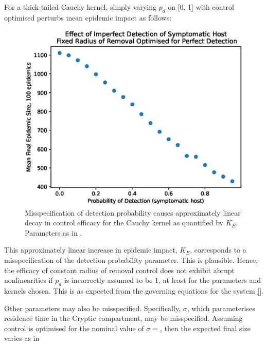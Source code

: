 \documentclass[prstpaper]{revtex4-2}
\begin{document}
For a thick-tailed Cauchy kernel, simply varying $p_d$ on [0, 1] with control optimised perturbs mean epidemic impact as follows: 

\begin{figure} [hbt!]
\includegraphics[scale=.4]{pd.eps}
\caption{\label{fig} Misspecification of detection probability causes approximately linear decay in control efficacy for the Cauchy kernel as quantified by $K_E$. Parameters as in \cite{HyattTwynham2017}. }
\end{figure}

This approximately linear increase in epidemic impact, $K_{E}$, corresponds to a misspecification of the detection probability parameter. This is plausible. Hence, the efficacy of constant radius of removal control does not exhibit abrupt nonlinearities if $p_{d}$ is incorrectly assumed to be 1, at least for the parameters and kernels chosen. This is as expected from the governing equations for the system \ref{}.  

%

Other parameters may also be misspecified. Specifically, $\sigma$, which parameterises residence time in the Cryptic compartment, may be misspecified. Assuming control is optimised for the nominal value of $\sigma =  $, then the expected final size varies as in 
\end{document}

